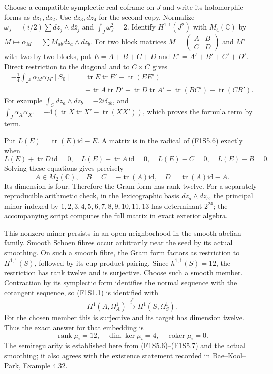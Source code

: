 Choose a compatible symplectic real coframe on $J$ and write
its holomorphic forms as $dz_1,dz_2$. Use $dz_3,dz_4$ for the
second copy. Normalize $\omega_J=(i/2)\sum dz_j\wedge d\bar z_j$
and $\int_J\omega_J^2=2$. Identify $H^{1,1}(J^2)$ with
$M_4(\mathbb C)$ by
$M\mapsto\alpha_M=\sum M_{ab}dz_a\wedge d\bar z_b$.
For two block matrices
$M=\left(\begin{smallmatrix}A&B\\C&D\end{smallmatrix}\right)$
and $M'$ with two-by-two blocks, put $E=A+B+C+D$ and
$E'=A'+B'+C'+D'$. Direct restriction to the diagonal and
to $C\times C$ gives
\[
 \begin{split}
 -\tfrac14\int_{J^2}\alpha_M\alpha_{M'}[S_0]
 ={}&\operatorname{tr}E\operatorname{tr}E'-\operatorname{tr}(EE')\\
 &+\operatorname{tr}A\operatorname{tr}D'
   +\operatorname{tr}D\operatorname{tr}A'
   -\operatorname{tr}(BC')-\operatorname{tr}(CB').
 \end{split}
 \tag{F1S5.6}
\]
For example $\int_C dz_a\wedge d\bar z_b=-2i\delta_{ab}$,
and $\int_J\alpha_X\alpha_{X'}=-4(\operatorname{tr}X
\operatorname{tr}X'-\operatorname{tr}(XX'))$, which proves
the formula term by term.

Put $L(E)=\operatorname{tr}(E)\mathrm{id}-E$. A matrix is
in the radical of (F1S5.6) exactly when
\[
 L(E)+\operatorname{tr}D\,\mathrm{id}=0,\quad
 L(E)+\operatorname{tr}A\,\mathrm{id}=0,\quad
 L(E)-C=0,\quad L(E)-B=0.
\]
Solving these equations gives precisely
\[
 A\in M_2(\mathbb C),\quad
 B=C=-\operatorname{tr}(A)\mathrm{id},\quad
 D=\operatorname{tr}(A)\mathrm{id}-A.
 \tag{F1S5.7}
\]
Its dimension is four. Therefore the Gram form has rank twelve.
For a separately reproducible arithmetic check, in the
lexicographic basis $dz_a\wedge d\bar z_b$, the principal
minor indexed by
$1,2,3,4,5,6,7,8,9,10,11,13$ has determinant $2^{24}$;
the accompanying script computes the full matrix in exact
exterior algebra.

This nonzero minor persists in an open neighborhood in the
smooth abelian family. Smooth Schoen fibres occur arbitrarily
near the seed by its actual smoothing. On such a smooth
fibre, the Gram form factors as restriction to
$H^{1,1}(S)$, followed by its cup-product pairing. Since
$h^{1,1}(S)=12$, the restriction has rank twelve and is
surjective. Choose such a smooth member. Contraction by its
symplectic form identifies the normal sequence with the
cotangent sequence, so (F1S1.1) is identified with
\[
 H^1(A,\Omega_A^1)\xrightarrow{i^*}H^1(S,\Omega_S^1).
 \tag{F1S5.8}
\]
For the chosen member this is surjective and its target has
dimension twelve. Thus the exact answer for that embedding is
\[
 \operatorname{rank}\mu_i=12,\quad\dim\ker\mu_i=4,
 \quad\operatorname{coker}\mu_i=0.
 \tag{F1S5.9}
\]
The semiregularity is established here from (F1S5.6)--(F1S5.7)
and the actual smoothing; it also agrees with the existence
statement recorded in Bae--Kool--Park, Example 4.32.

